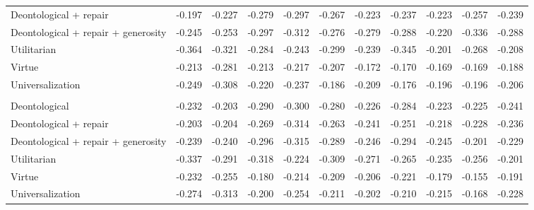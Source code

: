 \begin{table}[t]
\begin{tabular}{lrrrrrrrrrr}
Deontological + repair & -0.197 & -0.227 & -0.279 & -0.297 & -0.267 & -0.223 & -0.237 & -0.223 & -0.257 & -0.239 \\
Deontological + repair + generosity & -0.245 & -0.253 & -0.297 & -0.312 & -0.276 & -0.279 & -0.288 & -0.220 & -0.336 & -0.288 \\
Utilitarian & -0.364 & -0.321 & -0.284 & -0.243 & -0.299 & -0.239 & -0.345 & -0.201 & -0.268 & -0.208 \\
Virtue & -0.213 & -0.281 & -0.213 & -0.217 & -0.207 & -0.172 & -0.170 & -0.169 & -0.169 & -0.188 \\
Universalization & -0.249 & -0.308 & -0.220 & -0.237 & -0.186 & -0.209 & -0.176 & -0.196 & -0.196 & -0.206 \\
\addlinespace
\multicolumn{11}{l}{\emph{Chicken}} \\
Deontological & -0.232 & -0.203 & -0.290 & -0.300 & -0.280 & -0.226 & -0.284 & -0.223 & -0.225 & -0.241 \\
Deontological + repair & -0.203 & -0.204 & -0.269 & -0.314 & -0.263 & -0.241 & -0.251 & -0.218 & -0.228 & -0.236 \\
Deontological + repair + generosity & -0.239 & -0.240 & -0.296 & -0.315 & -0.289 & -0.246 & -0.294 & -0.245 & -0.201 & -0.229 \\
Utilitarian & -0.337 & -0.291 & -0.318 & -0.224 & -0.309 & -0.271 & -0.265 & -0.235 & -0.256 & -0.201 \\
Virtue & -0.232 & -0.255 & -0.180 & -0.214 & -0.209 & -0.206 & -0.221 & -0.179 & -0.155 & -0.191 \\
Universalization & -0.274 & -0.313 & -0.200 & -0.254 & -0.211 & -0.202 & -0.210 & -0.215 & -0.168 & -0.228 \\
\bottomrule
\end{tabular}
\end{table}
